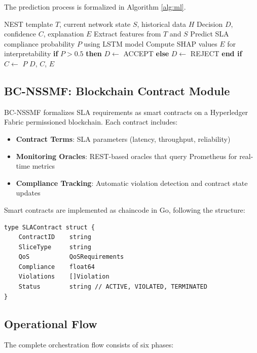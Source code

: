 \documentclass[review]{elsarticle}
\begin{document}
The prediction process is formalized in Algorithm \ref{alg:ml}.

\begin{algorithm}[h]
\caption{ML-Based SLA Prediction}
\label{alg:ml}
\begin{algorithmic}[1]
\REQUIRE NEST template $T$, current network state $S$, historical data $H$
\ENSURE Decision $D$, confidence $C$, explanation $E$
\STATE Extract features from $T$ and $S$
\STATE Predict SLA compliance probability $P$ using LSTM model
\STATE Compute SHAP values $E$ for interpretability
\STATE \textbf{if} $P > 0.5$ \textbf{then}
\STATE \quad $D \leftarrow$ ACCEPT
\STATE \textbf{else}
\STATE \quad $D \leftarrow$ REJECT
\STATE \textbf{end if}
\STATE $C \leftarrow$ $P$
\RETURN $D$, $C$, $E$
\end{algorithmic}
\end{algorithm}

\subsection{BC-NSSMF: Blockchain Contract Module}

BC-NSSMF formalizes SLA requirements as smart contracts on a Hyperledger Fabric permissioned blockchain. Each contract includes:
\begin{itemize}
    \item \textbf{Contract Terms}: SLA parameters (latency, throughput, reliability)
    \item \textbf{Monitoring Oracles}: REST-based oracles that query Prometheus for real-time metrics
    \item \textbf{Compliance Tracking}: Automatic violation detection and contract state updates
\end{itemize}

Smart contracts are implemented as chaincode in Go, following the structure:

\begin{verbatim}
type SLAContract struct {
    ContractID    string
    SliceType     string
    QoS           QoSRequirements
    Compliance    float64
    Violations    []Violation
    Status        string // ACTIVE, VIOLATED, TERMINATED
}
\end{verbatim}

\subsection{Operational Flow}

The complete orchestration flow consists of six phases:
\end{document}
